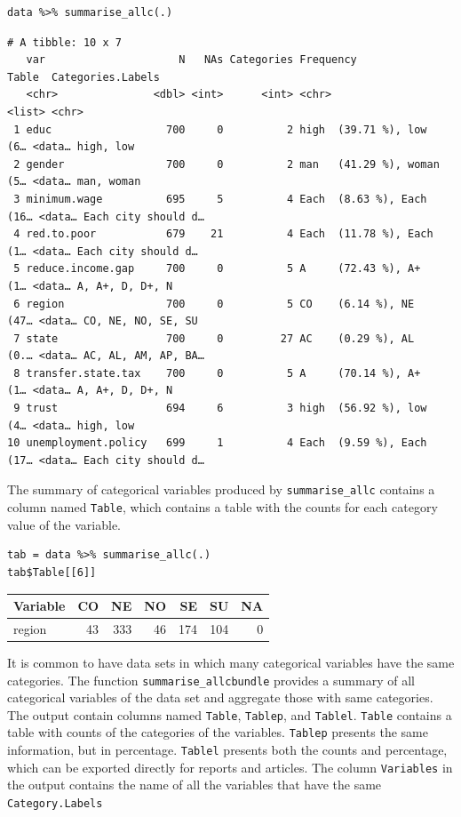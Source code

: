\documentclass[a4paper]{article}
\begin{document}
\lstset{numbers=left,language=r,label=orgdb3f73a,caption= ,captionpos=b}
\begin{lstlisting}
data %>% summarise_allc(.)
\end{lstlisting}

\begin{verbatim}
# A tibble: 10 x 7
   var                     N   NAs Categories Frequency                  Table  Categories.Labels  
   <chr>               <dbl> <int>      <int> <chr>                      <list> <chr>              
 1 educ                  700     0          2 high  (39.71 %), low   (6… <data… high, low          
 2 gender                700     0          2 man   (41.29 %), woman (5… <data… man, woman         
 3 minimum.wage          695     5          4 Each  (8.63 %), Each  (16… <data… Each city should d…
 4 red.to.poor           679    21          4 Each  (11.78 %), Each  (1… <data… Each city should d…
 5 reduce.income.gap     700     0          5 A     (72.43 %), A+    (1… <data… A, A+, D, D+, N    
 6 region                700     0          5 CO    (6.14 %), NE    (47… <data… CO, NE, NO, SE, SU 
 7 state                 700     0         27 AC    (0.29 %), AL    (0.… <data… AC, AL, AM, AP, BA…
 8 transfer.state.tax    700     0          5 A     (70.14 %), A+    (1… <data… A, A+, D, D+, N    
 9 trust                 694     6          3 high  (56.92 %), low   (4… <data… high, low          
10 unemployment.policy   699     1          4 Each  (9.59 %), Each  (17… <data… Each city should d…
\end{verbatim}

The summary of categorical variables produced by \texttt{summarise\_allc} contains a column named \texttt{Table}, which contains a table with the counts for each category value of the variable.

\lstset{numbers=left,language=r,label=org9c07d05,caption= ,captionpos=b}
\begin{lstlisting}
tab = data %>% summarise_allc(.)
tab$Table[[6]]
\end{lstlisting}

\begin{center}
\begin{tabular}{lrrrrrr}
Variable & CO & NE & NO & SE & SU & NA\\
\hline
region & 43 & 333 & 46 & 174 & 104 & 0\\
\end{tabular}
\end{center}

It is common to have data sets in which many categorical variables have the same categories. The function \texttt{summarise\_allcbundle} provides a summary of all categorical variables of the data set and aggregate those with same categories. The output contain columns named \texttt{Table}, \texttt{Tablep}, and \texttt{Tablel}. \texttt{Table} contains a table with counts of the categories of the variables. \texttt{Tablep} presents the same information, but in percentage. \texttt{Tablel} presents both the counts and percentage, which can be exported directly for reports and articles. The column \texttt{Variables} in the output contains the name of all the variables that have the same \texttt{Category.Labels}
\end{document}
